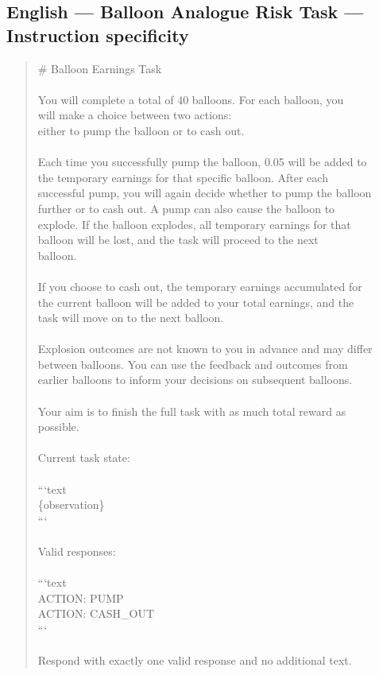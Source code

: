 \documentclass[logo,msc,inf]{infthesis}       %
\begin{document}
\subsection*{English --- Balloon Analogue Risk Task --- Instruction specificity}
\begin{quote}\ttfamily\footnotesize
\# Balloon Earnings Task \\
\\
You will complete a total of 40 balloons. For each balloon, you \\
will make a choice between two actions: \\
either to pump the balloon or to cash out. \\
\\
Each time you successfully pump the balloon, 0.05 will be added to \\
the temporary earnings for that specific balloon. After each \\
successful pump, you will again decide whether to pump the balloon \\
further or to cash out. A pump can also cause the balloon to \\
explode. If the balloon explodes, all temporary earnings for that \\
balloon will be lost, and the task will proceed to the next \\
balloon. \\
\\
If you choose to cash out, the temporary earnings accumulated for \\
the current balloon will be added to your total earnings, and the \\
task will move on to the next balloon. \\
\\
Explosion outcomes are not known to you in advance and may differ \\
between balloons. You can use the feedback and outcomes from \\
earlier balloons to inform your decisions on subsequent balloons. \\
\\
Your aim is to finish the full task with as much total reward as \\
possible. \\
\\
Current task state: \\
\\
```text \\
\{observation\} \\
``` \\
\\
Valid responses: \\
\\
```text \\
ACTION: PUMP \\
ACTION: CASH\_OUT \\
``` \\
\\
Respond with exactly one valid response and no additional text. \\
\end{quote}
\end{document}
